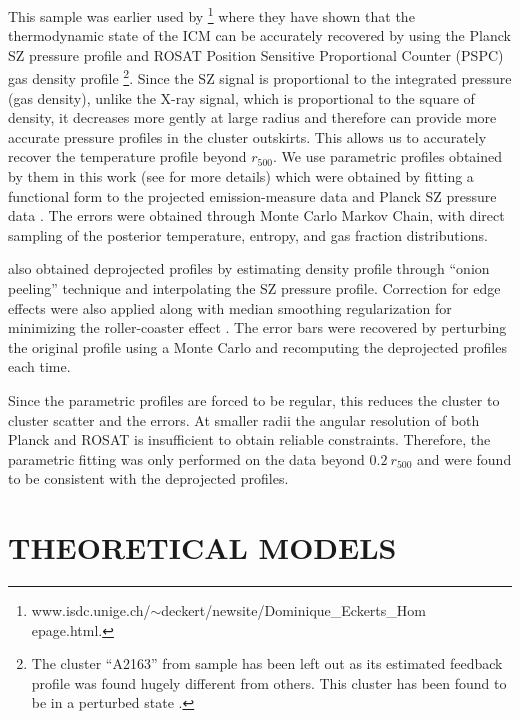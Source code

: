 \documentclass[a4paper,fleqn,usenatbib]{mnras}
\begin{document}
This sample  was earlier used by \cite{Eckert2013a,Eckert2013b}\footnote{www.isdc.unige.ch/$\sim$deckert/newsite/Dominique\_Eckerts\_Hom\\epage.html.} where they have shown that the thermodynamic state of the ICM can be accurately 
recovered by using the Planck SZ pressure profile \citep{Planck2013a} and  ROSAT Position Sensitive Proportional Counter (PSPC)  gas density profile \citep{Eckert2012}\footnote{The cluster ``A2163'' from \cite{Eckert2013a,Eckert2013b} sample has been left out as its estimated feedback profile was found hugely different from others. This cluster has been found to be in a perturbed state \citep{Soucail2012}.}. 
Since the SZ signal  is proportional to the integrated pressure (gas density), unlike the X-ray signal, which is proportional to the square of density, it decreases more gently at large radius and therefore can provide more accurate pressure profiles in the cluster outskirts. This allows us to accurately recover the temperature profile beyond $r_{500}$. 
 We use parametric profiles obtained by them in this work (see \cite{Eckert2013a} for more details) which were obtained by fitting a functional form to the projected emission-measure data \citep{Vikhlinin2006} and Planck SZ pressure data \citep{Nagai2007}.  The errors were obtained through Monte Carlo Markov Chain, with direct sampling of the posterior temperature, entropy, and gas fraction distributions.

 \cite{Eckert2013a} also obtained deprojected profiles by estimating density profile through ``onion peeling'' technique \citep{Kriss1983,Eckert2012} and interpolating the SZ pressure profile. Correction for edge effects  were also applied along with median smoothing regularization for minimizing the roller-coaster effect \citep{McLaughlin1999}. The error bars were recovered by perturbing the original profile using a Monte Carlo and recomputing the deprojected profiles each time. 
 
 Since the  parametric profiles are forced to be regular, this reduces the cluster to cluster scatter and the errors. At smaller radii the angular resolution of both  Planck and ROSAT is insufficient to obtain reliable constraints. Therefore, the parametric fitting was only performed on the data beyond $0.2~r_{500}$ and were found to be consistent with the deprojected profiles.

\section{THEORETICAL MODELS}
\end{document}

